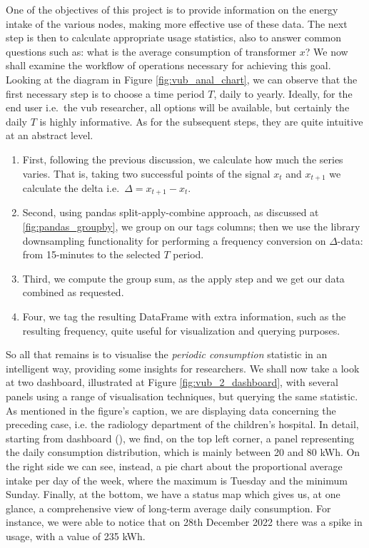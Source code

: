 One of the objectives of this project is to provide information on the energy intake of the various nodes, making more effective use of these data. 
The next step is then to calculate appropriate usage statistics, also to answer common questions such as: what is the average consumption of transformer $x$?
We now shall examine the workflow of operations necessary for achieving this goal.
Looking at the diagram in Figure \ref{fig:vub_anal_chart}, we can observe that the first necessary step is to choose a time period $T$, daily to yearly.
Ideally, for the end user i.e.\ the vub researcher, all options will be available, but certainly the daily $T$ is highly informative.
As for the subsequent steps, they are quite intuitive at an abstract level.
\begin{enumerate}
    \item First, following the previous discussion, we calculate how much the series varies. 
    That is, taking two successful points of the signal $x_t$ and $x_{t+1}$ we calculate the delta i.e.\ $\Delta = x_{t+1} - x_t$.
    \item Second, using pandas split-apply-combine approach, as discussed at \ref{fig:pandas_groupby}, we group on our tags columns; then we use the library downsampling 
    functionality for performing a frequency conversion on $\Delta$-data: from 15-minutes to the selected $T$ period.
    \item Third, we compute the group sum, as the apply step and we get our data combined as requested.
    \item Four, we tag the resulting DataFrame with extra information, such as the resulting frequency, quite useful for visualization and querying purposes.
\end{enumerate}

So all that remains is to visualise the \textit{periodic consumption} statistic in an intelligent way, providing some insights for researchers.
We shall now take a look at two dashboard, illustrated at Figure \ref{fig:vub_2_dashboard}, with several panels using a range of visualisation techniques, but querying the same statistic.
As mentioned in the figure's caption, we are displaying data concerning the preceding case, i.e. the radiology department of the children's hospital.
In detail, starting from dashboard (), we find, on the top left corner, a panel representing the daily consumption distribution, which is mainly between 20 and 80 kWh. 
On the right side we can see, instead, a pie chart about the proportional average intake per day of the week, where the maximum is Tuesday and the minimum Sunday. 
Finally, at the bottom, we have a status map which gives us, at one glance, a comprehensive view of long-term average daily consumption. 
For instance, we were able to notice that on 28th December 2022 there was a spike in usage, with a value of 235 kWh.

